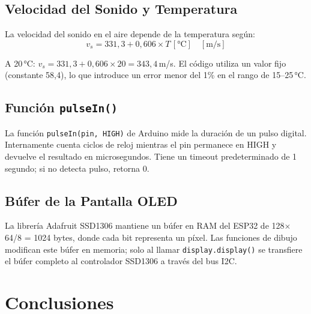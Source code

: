 \documentclass[12pt,a4paper]{article}
\begin{document}
\subsection{Velocidad del Sonido y Temperatura}

La velocidad del sonido en el aire depende de la temperatura según:
\begin{equation}
v_s = 331{,}3 + 0{,}606 \times T\,[\text{°C}] \quad [\text{m/s}]
\end{equation}

A 20\,°C: $v_s = 331{,}3 + 0{,}606 \times 20 = 343{,}4$\,m/s. El código utiliza un valor fijo (constante 58,4), lo que introduce un error menor del 1\% en el rango de 15--25\,°C.

\subsection{Función \texttt{pulseIn()}}

La función \texttt{pulseIn(pin, HIGH)} de Arduino mide la duración de un pulso digital. Internamente cuenta ciclos de reloj mientras el pin permanece en HIGH y devuelve el resultado en microsegundos. Tiene un timeout predeterminado de 1 segundo; si no detecta pulso, retorna 0.

\subsection{Búfer de la Pantalla OLED}

La librería Adafruit SSD1306 mantiene un búfer en RAM del ESP32 de 128$\times$64/8 = 1024 bytes, donde cada bit representa un píxel. Las funciones de dibujo modifican este búfer en memoria; solo al llamar \texttt{display.display()} se transfiere el búfer completo al controlador SSD1306 a través del bus I2C.

\section{Conclusiones}
\end{document}
